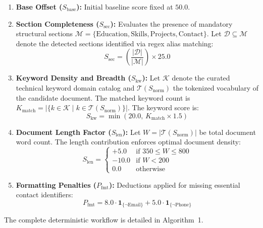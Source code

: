 \documentclass[conference]{IEEEtran}
\begin{document}
\begin{enumerate}
    \item \textbf{Base Offset ($S_{\mathrm{base}}$):} Initial baseline score fixed at $50.0$.
    \item \textbf{Section Completeness ($S_{\mathrm{sec}}$):} Evaluates the presence of mandatory structural sections $\mathcal{M} = \{\text{Education}, \text{Skills}, \text{Projects}, \text{Contact}\}$. Let $\mathcal{D} \subseteq \mathcal{M}$ denote the detected sections identified via regex alias matching:
    \begin{equation}
        S_{\mathrm{sec}} = \left( \frac{|\mathcal{D}|}{|\mathcal{M}|} \right) \times 25.0
    \end{equation}
    \item \textbf{Keyword Density and Breadth ($S_{\mathrm{kw}}$):} Let $\mathcal{K}$ denote the curated technical keyword domain catalog and $\mathcal{T}(S_{\mathrm{norm}})$ the tokenized vocabulary of the candidate document. The matched keyword count is $K_{\mathrm{match}} = |\{k \in \mathcal{K} \mid k \in \mathcal{T}(S_{\mathrm{norm}})\}|$. The keyword score is:
    \begin{equation}
        S_{\mathrm{kw}} = \min\left( 20.0, \, K_{\mathrm{match}} \times 1.5 \right)
    \end{equation}
    \item \textbf{Document Length Factor ($S_{\mathrm{len}}$):} Let $W = |\mathcal{T}(S_{\mathrm{norm}})|$ be total document word count. The length contribution enforces optimal document density:
    \begin{equation}
        S_{\mathrm{len}} = 
        \begin{cases}
            +5.0 & \text{if } 350 \le W \le 800 \\
            -10.0 & \text{if } W < 200 \\
            0.0 & \text{otherwise}
        \end{cases}
    \end{equation}
    \item \textbf{Formatting Penalties ($P_{\mathrm{fmt}}$):} Deductions applied for missing essential contact identifiers:
    \begin{equation}
        P_{\mathrm{fmt}} = 8.0 \cdot \mathbf{1}_{\{\neg\text{Email}\}} + 5.0 \cdot \mathbf{1}_{\{\neg\text{Phone}\}}
    \end{equation}
\end{enumerate}

The complete deterministic workflow is detailed in Algorithm~1.
\end{document}
